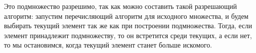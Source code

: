 \documentclass[10pt]{article}
\begin{document}
\begin{enumerate}
	Это подмножество разрешимо, так как можно составить такой разрешающий алгоритм: запустим перечисляющий алгоритм для исходного множества, и будем выбирать текущий элемент так же как при построении подмножества. Тогда, если элемент принадлежит подмножеству, то он встретится среди текущих, а если нет, то мы остановимся, когда текущий элемент станет больше искомого.

\end{enumerate}
\end{document}
